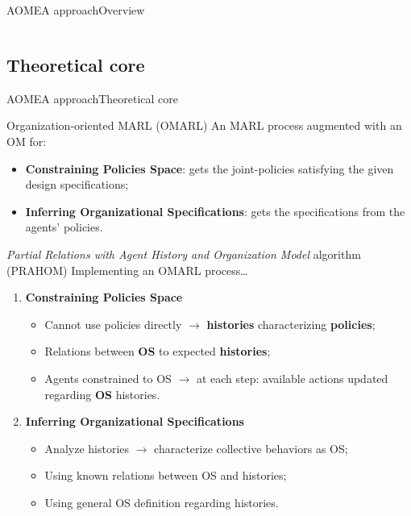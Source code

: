 \begin{frame}{AOMEA approach}{Overview}
\begin{columns}
    \end{columns}

\end{frame}


\subsection{Theoretical core}

\begin{frame}[allowframebreaks]{AOMEA approach}{Theoretical core}

    \begin{block}{Organization-oriented MARL (OMARL)}
        An MARL process augmented with an OM for:
        \begin{itemize}
            \item \textbf{Constraining Policies Space}: gets the joint-policies satisfying the given design specifications;
            \item \textbf{Inferring Organizational Specifications}: gets the specifications from the agents' policies.
        \end{itemize}

    \end{block}

    \begin{block}{\emph{Partial Relations with Agent History and Organization Model} algorithm (PRAHOM)}
        Implementing an OMARL process\dots
        \begin{enumerate}
            \item \textbf{Constraining Policies Space}
                  \begin{itemize}
                      \item Cannot use policies directly $\rightarrow$ \textbf{histories} characterizing \textbf{policies};
                      \item Relations between \textbf{OS} to expected \textbf{histories};
                      \item Agents constrained to OS $\rightarrow$ at each step: available actions updated regarding \textbf{OS} histories.
                  \end{itemize}

            \item \textbf{Inferring Organizational Specifications}
                  \begin{itemize}
                      \item Analyze histories $\rightarrow$ characterize collective behaviors as OS;
                      \item Using known relations between OS and histories;
                      \item Using general OS definition regarding histories.
                  \end{itemize}
        \end{enumerate}
    \end{block}
\end{frame}

